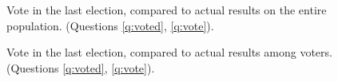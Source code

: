 \begin{figure}[h!]
    \caption[Vote in the last election compared to actual results (entire population)]{Vote in the last election, compared to actual results on the entire population. (Questions \ref{q:voted}, \ref{q:vote}).
    }\label{fig:vote_representativeness}
\end{figure}

\begin{figure}[h!]
    \caption[Vote in the last election compared to actual results (among voters)]{Vote in the last election, compared to actual results among voters. (Questions \ref{q:voted}, \ref{q:vote}).
    }\label{fig:vote_pnr_out}
\end{figure}

